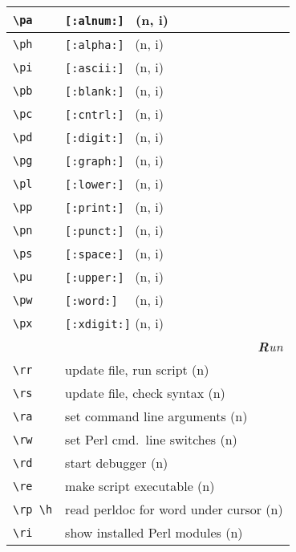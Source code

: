 \documentclass[oneside,10pt,landscape,DIV17]{scrartcl}
\begin{document}
\begin{multicols}{3}
\begin{center}
\begin{tabular}[]{|p{11mm}|p{58mm}|}
\hline \verb'\pa' &  \verb'[:alnum:] '         \hfill (n, i)   \\
\hline \verb'\ph' &  \verb'[:alpha:] '         \hfill (n, i)   \\
\hline \verb'\pi' &  \verb'[:ascii:] '         \hfill (n, i)   \\
\hline \verb'\pb' &  \verb'[:blank:] '         \hfill (n, i)   \\
\hline \verb'\pc' &  \verb'[:cntrl:] '         \hfill (n, i)   \\
\hline \verb'\pd' &  \verb'[:digit:] '         \hfill (n, i)   \\
\hline \verb'\pg' &  \verb'[:graph:] '         \hfill (n, i)   \\
\hline \verb'\pl' &  \verb'[:lower:] '         \hfill (n, i)   \\
\hline \verb'\pp' &  \verb'[:print:] '         \hfill (n, i)   \\
\hline \verb'\pn' &  \verb'[:punct:] '         \hfill (n, i)   \\
\hline \verb'\ps' &  \verb'[:space:] '         \hfill (n, i)   \\
\hline \verb'\pu' &  \verb'[:upper:] '         \hfill (n, i)   \\
\hline \verb'\pw' &  \verb'[:word:]  '         \hfill (n, i)   \\
\hline \verb'\px' &  \verb'[:xdigit:]'         \hfill (n, i)   \\
\hline
\hline
\multicolumn{2}{|r|}{\textsl{\textbf{R}un}} \\
\hline \verb'\rr'    & update file, run script              \hfill (n)   \\
\hline \verb'\rs'    & update file, check syntax            \hfill (n)   \\
\hline \verb'\ra'    & set command line arguments           \hfill (n)   \\
\hline \verb'\rw'    & set Perl cmd.\ line switches         \hfill (n)   \\
\hline \verb'\rd'    & start debugger                       \hfill (n)   \\
\hline \verb'\re'    & make script executable               \hfill (n)   \\
\hline \verb'\rp \h' & read perldoc for word under cursor   \hfill (n)   \\
\hline \verb'\ri'    & show installed Perl modules          \hfill (n)   \\

\end{tabular}
\end{center}
\end{multicols}
\end{document}
